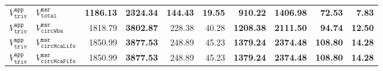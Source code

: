 \begin{tabular}{llrrrrrrrr}
   \hline
$V^{\mathtt{app}}_{\mathtt{triv}}$ & $V^{\mathtt{msr}}_{\mathtt{total}}$        & \textbf{1186.13} & \textbf{2324.34} & \textbf{144.43} & \textbf{19.55} &  \textbf{910.22} & \textbf{1406.98} &  \textbf{72.53} &  \textbf{7.83} \\ 
  $V^{\mathtt{app}}_{\mathtt{triv}}$ & $V^{\mathtt{msr}}_{\mathtt{circWba}}$     & 1818.79          & \textbf{3802.87} & 228.38 &          40.28         & \textbf{1208.38} & \textbf{2111.50} &  \textbf{94.74} & \textbf{12.50} \\ 
  $V^{\mathtt{app}}_{\mathtt{triv}}$ & $V^{\mathtt{msr}}_{\mathtt{circMcaLifo}}$ & 1850.99          & \textbf{3877.53} & 248.89 &          45.23         & \textbf{1379.24} & \textbf{2374.48} & \textbf{108.80} & \textbf{14.28} \\ 
  $V^{\mathtt{app}}_{\mathtt{triv}}$ & $V^{\mathtt{msr}}_{\mathtt{circMcaFifo}}$ & 1850.99          & \textbf{3877.53} & 248.89 &          45.23         & \textbf{1379.24} & \textbf{2374.48} & \textbf{108.80} & \textbf{14.28} \\ 
   \hline
\end{tabular}
